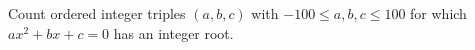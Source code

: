 Count ordered integer triples $(a,b,c)$ with $-100\le a,b,c\le100 $ for which $ ax^2+bx+c=0 $ has an integer root.
